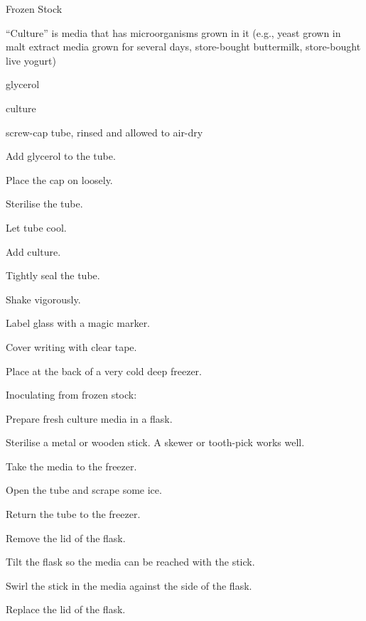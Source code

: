 \begin{recipe}{Frozen Stock}{}{}

``Culture'' is media that has microorganisms grown in it (e.g., yeast grown in malt extract media grown for several days, store-bought buttermilk, store-bought live yogurt)

\begin{ingredients}
\item {} glycerol
\item {} culture
\item screw-cap  tube, rinsed and allowed to air-dry
\end{ingredients}

\begin{directions}
\item Add glycerol to the tube.
\item Place the cap on loosely.
\item Sterilise the tube.
\item Let tube cool.
\item Add culture.
\item Tightly seal the tube.
\item Shake vigorously.
\item Label glass with a magic marker.
\item Cover writing with clear tape.
\item Place at the back of a very cold deep freezer.
\end{directions}

Inoculating from frozen stock:

\begin{directions}
\item Prepare fresh culture media in a flask.
\item Sterilise a metal or wooden stick. A skewer or tooth-pick works well.
\item Take the media to the freezer.
\item Open the tube and scrape some ice.
\item Return the tube to the freezer.
\item Remove the lid of the flask.
\item Tilt the flask so the media can be reached with the stick.
\item Swirl the stick in the media against the side of the flask.
\item Replace the lid of the flask.
\end{directions}

\end{recipe}
